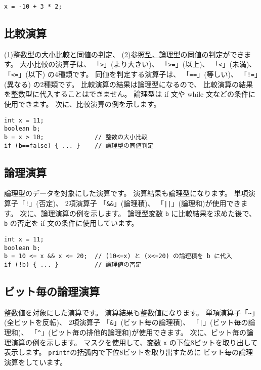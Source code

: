 \begin{mylist}
\begin{verbatim}
x = -10 + 3 * 2;
\end{verbatim}
\end{mylist}

\subsection{比較演算}

\underline{(1)整数型の大小比較と同値の判定}、
\underline{(2)参照型、論理型の同値の判定}ができます。
大小比較の演算子は、
「\verb/>/」(より大きい)、
「\verb/>=/」(以上)、
「\verb/</」(未満)、
「\verb/<=/」(以下) の4種類です。
同値を判定する演算子は、
「\verb/==/」(等しい)、
「\verb/!=/」(異なる)
の2種類です。
比較演算の結果は論理型になるので、
比較演算の結果を整数型に代入することはできません。
論理型は if 文や while 文などの条件に使用できます。
次に、比較演算の例を示します。

\begin{mylist}
\begin{verbatim}
int x = 11;
boolean b;
b = x > 10;              // 整数の大小比較
if (b==false) { ... }    // 論理型の同値判定
\end{verbatim}
\end{mylist}

\subsection{論理演算}

論理型のデータを対象にした演算です。
演算結果も論理型になります。
単項演算子「\verb/!/」(否定)、
2項演算子
「\verb/&&/」(論理積)、
「\verb/||/」(論理和)が使用できます。
次に、論理演算の例を示します。
論理型変数 \verb/b/ に比較結果を求めた後で、
\verb/b/ の否定を if 文の条件に使用しています。

\begin{mylist}
\begin{verbatim}
int x = 11;
boolean b;
b = 10 <= x && x <= 20;  // (10<=x) と (x<=20) の論理積を b に代入
if (!b) { ... }          // 論理値の否定
\end{verbatim}
\end{mylist}

\subsection{ビット毎の論理演算}

整数値を対象にした演算です。
演算結果も整数値になります。
単項演算子「\verb/~/」(全ビットを反転)、
2項演算子
「\verb/&/」(ビット毎の論理積)、
「\verb/|/」(ビット毎の論理和)、
「\verb/^/」(ビット毎の排他的論理和)が使用できます。
次に、ビット毎の論理演算の例を示します。
マスクを使用して、変数 \verb/x/ の下位8ビットを取り出して表示します。
\verb/printf/の括弧内で下位8ビットを取り出すために
ビット毎の論理演算をしています。

